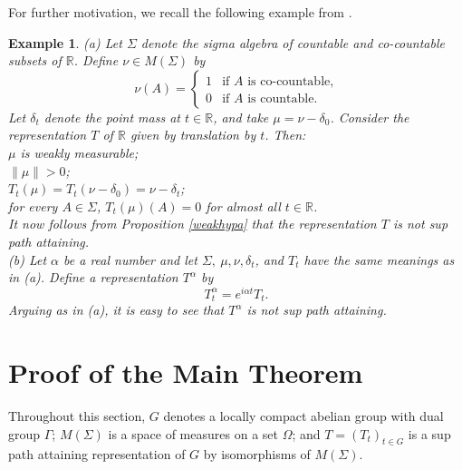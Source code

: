 \documentclass[12pt]{article}
\newcommand{\R}{\mathbb R}
\renewcommand{\O}{\Omega}
\newtheorem{ex}[defin]{Example}
\begin{document}
For further motivation, we recall the following 
example from \cite{ams2}.
\begin{ex}
{\rm
(a) Let $\Sigma$ denote the sigma algebra of 
countable and co-countable subsets of $\R$.  
Define $\nu\in M(\Sigma)$ by
$$
\nu (A)=\left\{
\begin{array}{ll}
1 & \mbox{if $A$ is co-countable,}\\
0 &  \mbox{if $A$ is countable.}
\end{array}
\right.
$$
Let $\delta_t$ denote the point mass at $t\in \R$, 
and take $\mu=\nu-\delta_0$.  Consider the 
representation $T$ of $\R$ given by translation by $t$.  
Then:\\
$\mu$ is weakly measurable; \\
$\|\mu\|>0$;\\
$T_t(\mu)=T_t(\nu-\delta_0)=\nu-\delta_t$;\\
for every $A\in \Sigma$,  $T_t(\mu)(A)=0$ 
for almost all $t\in \R$.\\
It now follows from Proposition \ref{weakhypa} that the 
representation $T$ is not sup path attaining.\\
(b)  Let $\alpha$ be a real number and let 
$\Sigma,\ \mu, \nu, \delta_t$, and $T_t$ 
have the same meanings as in (a).  Define a 
representation $T^\alpha$ by
$$T_t^\alpha = e^{i\alpha t}T_t.$$ 
Arguing as in (a), it is easy to see that $T^\alpha$ 
is not sup path attaining.
}
\label{exnohypa}
\end{ex}

\section{Proof of the Main Theorem}

Throughout this section, $G$ denotes a locally compact abelian group with dual group $\Gamma$; $M(\Sigma)$ is a space of measures on a set
$\O$; and $T=(T_t)_{t\in G}$ is a sup path attaining representation of $G$ by isomorphisms of $M(\Sigma)$.   
\end{document}
